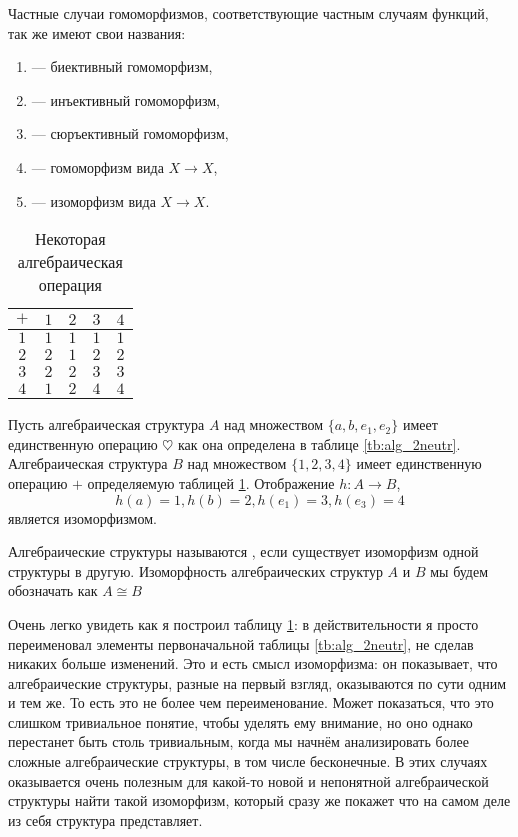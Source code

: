 \begin{definition}
	Частные случаи гомоморфизмов, соответствующие частным случаям функций, так же имеют свои названия:
\begin{enumerate}
	\item {} --- биективный гомоморфизм,
	\item {} --- инъективный гомоморфизм,
	\item {} --- сюръективный гомоморфизм,
	\item {} --- гомоморфизм вида $X\to X$,
	\item {} --- изоморфизм вида $X\to X$.
\end{enumerate}
\end{definition}

\begin{table}[h]\label{tb:alg_2neutriso}
	\centering
	\begin{tabular}{c|cccc}
		$+$ & $1$ & $2$ & $3$ & $4$ \\
		\hline
		$1$ & $1$ & $1$ & $1$ & $1$ \\
		$2$ & $2$ & $1$ & $2$ & $2$ \\
		$3$ & $2$ & $2$ & $3$ & $3$ \\
		$4$ & $1$ & $2$ & $4$ & $4$
	\end{tabular}
	\caption{Некоторая алгебраическая операция}
\end{table}

\begin{example}
  Пусть алгебраическая структура $A$ над множеством $\{a, b, e_1, e_2\}$ имеет единственную операцию $\heartsuit$ как она определена в таблице \ref{tb:alg_2neutr}. Алгебраическая структура $B$ над множеством $\{1, 2, 3, 4\}$ имеет единственную операцию $+$ определяемую таблицей \ref{tb:alg_2neutriso}. Отображение $h:A\to B$,
  \[
  h(a) = 1, h(b) =2, h(e_1) = 3, h(e_3) = 4
  \]
  является изоморфизмом.
\end{example}

\begin{definition}
	Алгебраические структуры называются , если существует изоморфизм одной структуры в другую. Изоморфность алгебраических структур $A$ и $B$ мы будем обозначать как $A\cong B$
\end{definition}

Очень легко увидеть как я построил таблицу \ref{tb:alg_2neutriso}: в действительности я просто переименовал элементы первоначальной таблицы \ref{tb:alg_2neutr}, не сделав никаких больше изменений. Это и есть смысл изоморфизма: он показывает, что алгебраические структуры, разные на первый взгляд, оказываются по сути одним и тем же. То есть это не более чем переименование. Может показаться, что это слишком тривиальное понятие, чтобы уделять ему внимание, но оно однако перестанет быть столь тривиальным, когда мы начнём анализировать более сложные алгебраические структуры, в том числе бесконечные. В этих случаях оказывается очень полезным для какой-то новой и непонятной алгебраической структуры найти такой изоморфизм, который сразу же покажет что на самом деле из себя структура представляет.

